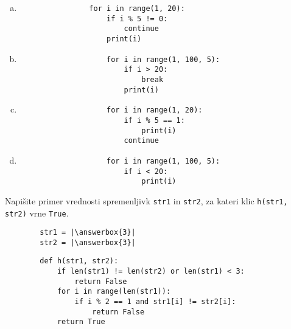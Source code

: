 \documentclass[arhiv, 10pt]{../izpit}
\newcommand{\inlinepy}[1]{\texttt{#1}}
\newcommand{\answerbox}[1]{\framebox{\vphantom{\large M}\hspace{#1cm}}}
\begin{document}
        \begin{multicols}{2}
        \begin{enumerate}[(a)]
\item 
            \begin{verbatim}
                for i in range(1, 20):
                    if i % 5 != 0:
                        continue
                    print(i)
            \end{verbatim}
        
\item 
                \begin{verbatim}
                    for i in range(1, 100, 5):
                        if i > 20:
                            break
                        print(i)
                \end{verbatim}
            
\item 
                \begin{verbatim}
                    for i in range(1, 20):
                        if i % 5 == 1:
                            print(i)
                        continue
                \end{verbatim}
            
\item 
                \begin{verbatim}
                    for i in range(1, 100, 5):
                        if i < 20:
                            print(i)
                \end{verbatim}
            
\end{enumerate}

        \end{multicols}
    
        \naloga*
        \begin{multicols}{2}
        \noindent
        Napišite primer vrednosti spremenljivk \inlinepy{str1} in \inlinepy{str2}, za kateri klic \inlinepy{h(str1, str2)} vrne \inlinepy{True}.
        \begin{verbatim}
        str1 = |\answerbox{3}|
        str2 = |\answerbox{3}|
        \end{verbatim}
        \vfil
        \columnbreak
        \begin{verbatim}
        def h(str1, str2):
            if len(str1) != len(str2) or len(str1) < 3:
                return False
            for i in range(len(str1)):
                if i % 2 == 1 and str1[i] != str2[i]:
                    return False
            return True
        \end{verbatim}
        \end{multicols}
    
\end{document}
